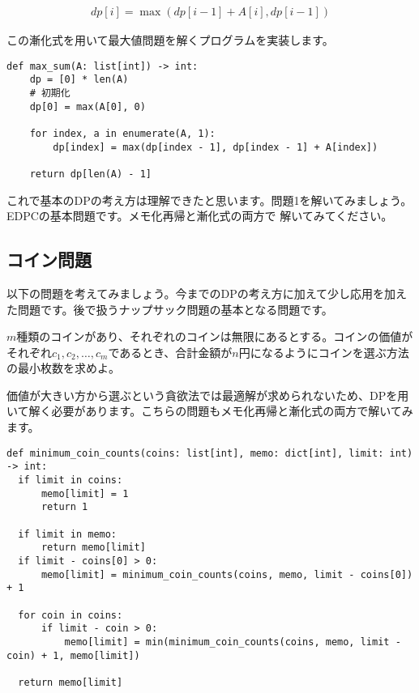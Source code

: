 \documentclass{jlreq}
\begin{document}
\begin{align*}
  dp[i] = \max(dp[i-1] + A[i], dp[i-1])
\end{align*}

この漸化式を用いて最大値問題を解くプログラムを実装します。

\begin{lstlisting}[caption=漸化式を用いた最大値問題の実装, frame=TRBL, label={dp_max}]
def max_sum(A: list[int]) -> int:
    dp = [0] * len(A)
    # 初期化
    dp[0] = max(A[0], 0)
    
    for index, a in enumerate(A, 1):
        dp[index] = max(dp[index - 1], dp[index - 1] + A[index])
    
    return dp[len(A) - 1]
\end{lstlisting}

これで基本のDPの考え方は理解できたと思います。問題1を解いてみましょう。EDPCの基本問題です。メモ化再帰と漸化式の両方で
解いてみてください。

\subsection{コイン問題}
以下の問題を考えてみましょう。今までのDPの考え方に加えて少し応用を加えた問題です。後で扱うナップサック問題の基本となる問題です。

\begin{problem}
  $m$種類のコインがあり、それぞれのコインは無限にあるとする。コインの価値がそれぞれ$c_1, c_2, \ldots, c_m$であるとき、合計金額が$n$円になるようにコインを選ぶ方法の最小枚数を求めよ。
\end{problem}

価値が大きい方から選ぶという貪欲法では最適解が求められないため、DPを用いて解く必要があります。こちらの問題もメモ化再帰と漸化式の両方で解いてみます。

\begin{lstlisting}[caption=メモ化再帰を用いたコイン問題の実装, frame=TRBL, label={memo_coin}]
def minimum_coin_counts(coins: list[int], memo: dict[int], limit: int) -> int:
  if limit in coins:
      memo[limit] = 1
      return 1
  
  if limit in memo:
      return memo[limit]
  if limit - coins[0] > 0:
      memo[limit] = minimum_coin_counts(coins, memo, limit - coins[0]) + 1    
  
  for coin in coins:
      if limit - coin > 0:
          memo[limit] = min(minimum_coin_counts(coins, memo, limit - coin) + 1, memo[limit])

  return memo[limit]
\end{lstlisting}
\end{document}
